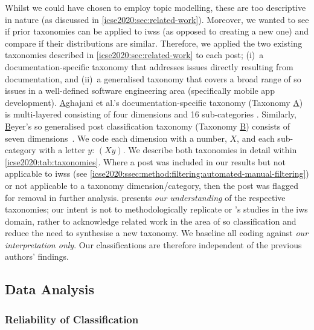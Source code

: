 Whilst we could have chosen to employ topic modelling, these are too descriptive in nature (as discussed in \cref{icse2020:sec:related-work}). Moreover, we wanted to see if prior taxonomies can be applied to \glspl{iws} (as opposed to creating a new one) and compare if their distributions are similar.
Therefore, we applied the two existing taxonomies described in \cref{icse2020:sec:related-work} to each post; (i)~a documentation-specific taxonomy that addresses issues directly resulting from documentation, and (ii)~a generalised taxonomy that covers a broad range of \gls{so} issues in a well-defined software engineering area (specifically mobile app development).
\uline{A}ghajani et al.'s documentation-specific taxonomy (Taxonomy \uline{A}) is multi-layered consisting of four dimensions and 16 sub-categories \citep{Aghajani:2019bo}. Similarly, \uline{B}eyer's \gls{so} generalised post classification taxonomy (Taxonomy \uline{B}) consists of seven dimensions~\citep{Beyer:2018fm}. We code each dimension with a number, $X$, and each sub-category with a letter $y$: $(Xy)$. We describe both taxonomies in detail within \cref{icse2020:tab:taxonomies}. Where a post was included in our results but not applicable to \glspl{iws} (see \cref{icse2020:ssec:method:filtering:automated-manual-filtering}) or not applicable to a taxonomy dimension/category, then the post was flagged for removal in further analysis.
 presents \textit{our understanding} of the respective taxonomies; our intent is not to methodologically replicate \citeauthor{Aghajani:2019bo} or \citeauthor{Beyer:2018fm}'s studies in the \gls{iws} domain, rather to acknowledge related work in the area of \gls{so} classification and reduce the need to synthesise a new taxonomy. We baseline all coding against \textit{our interpretation only}. Our classifications are therefore independent of the previous authors' findings.


\afterpage{\begin{landscape}

\end{landscape}}

\subsection{Data Analysis}

\subsubsection{Reliability of Classification}
\label{icse2020:ssec:method:filtering:reliability}

